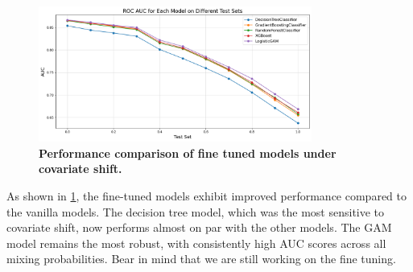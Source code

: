 \begin{figure}[H]
    \centering
    \includegraphics[width=0.8\textwidth]{assets/tuned.png} 
    \caption{\textbf{Performance comparison of fine tuned models under covariate shift.}}
    \label{fig:tuned-models-perf}
\end{figure}

As shown in \cref{fig:tuned-models-perf}, the fine-tuned models exhibit improved performance compared to the vanilla models. The decision tree model, which was the most sensitive to covariate shift, now performs almost on par with the other models. The GAM model remains the most robust, with consistently high AUC scores across all mixing probabilities. Bear in mind that we are still working on the fine tuning.
